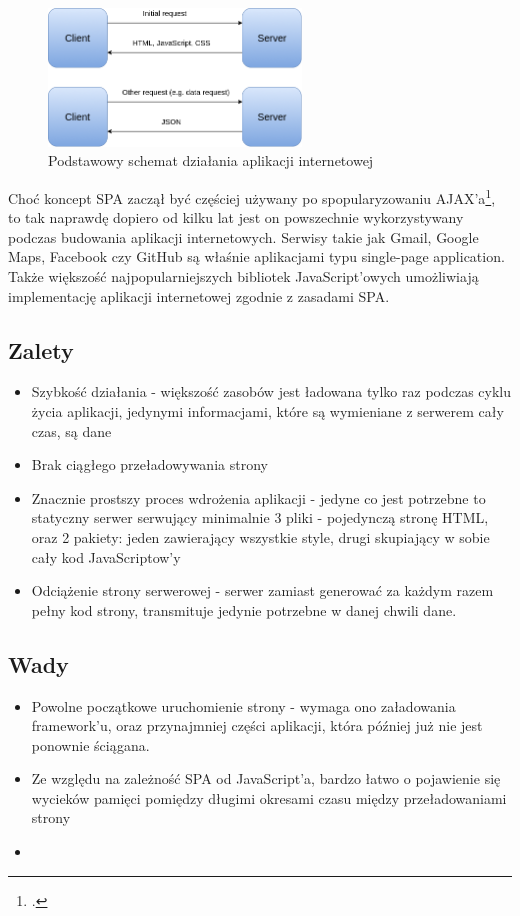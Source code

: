 \begin{figure}[h]
	\centering
	\includegraphics[width=0.6\textwidth]{images/spa}
	\caption{Podstawowy schemat działania aplikacji internetowej \cite{MaxCdnWebApp}}
\end{figure}

Choć koncept SPA zaczął być częściej używany po spopularyzowaniu AJAX'a\footcite{Asynchronous JavaScript And XML}, to tak naprawdę dopiero od kilku lat jest on powszechnie wykorzystywany podczas budowania aplikacji internetowych. Serwisy takie jak Gmail, Google Maps, Facebook czy GitHub są właśnie aplikacjami typu single-page application. Także większość najpopularniejszych bibliotek JavaScript'owych umożliwiają implementację aplikacji internetowej zgodnie z zasadami SPA.
\subsection{Zalety}
\begin{itemize}
	\item Szybkość działania - większość zasobów jest ładowana tylko raz podczas cyklu życia aplikacji, jedynymi informacjami, które są wymieniane z serwerem cały czas, są dane
	\item Brak ciągłego przeładowywania strony
	\item Znacznie prostszy proces wdrożenia aplikacji - jedyne co jest potrzebne to statyczny serwer serwujący minimalnie 3 pliki - pojedynczą stronę HTML, oraz 2 pakiety: jeden zawierający wszystkie style, drugi skupiający w sobie cały kod JavaScriptow'y
	\item Odciążenie strony serwerowej - serwer zamiast generować za każdym razem pełny kod strony, transmituje jedynie potrzebne w danej chwili dane.
\end{itemize}
\subsection{Wady}
\begin{itemize}
	\item Powolne początkowe uruchomienie strony - wymaga ono załadowania framework'u, oraz przynajmniej części aplikacji, która później już nie jest ponownie ściągana.
	\item Ze względu na zależność SPA od JavaScript'a, bardzo łatwo o pojawienie się wycieków pamięci pomiędzy długimi okresami czasu między przeładowaniami strony
	\item
\end{itemize}


